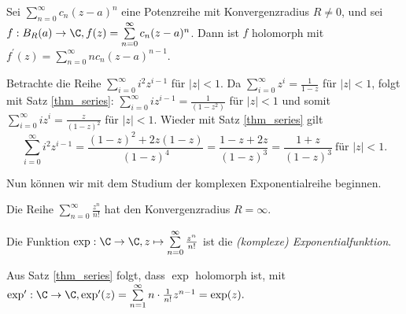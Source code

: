 \lecture
		\begin{thm}\label{thm_series}
			Sei $ \sum\limits_{n=0}^\infty c_n (z-a)^n $ eine Potenzreihe mit Konvergenzradius $R \neq 0$, und sei $ f: B_R(a) \to \C, f(z) = \sum\limits_{n=0}^\infty c_n (z-a)^n $. Dann ist $f$ holomorph mit $ f^\prime(z) = \sum\limits_{n=0}^\infty n c_n (z-a)^{n-1} $.
		\end{thm}
		
		\begin{exmp}
			Betrachte die Reihe $ \sum\limits_{i=0}^\infty i^2 z^{i-1} $ für $|z| < 1$. Da $ \sum\limits_{i=0}^\infty z^{i} = \frac{1}{1-z} $ für $|z|<1$, folgt mit Satz \ref{thm_series}: $ \sum\limits_{i=0}^\infty i z^{i-1} = \frac{1}{(1-z^2)} $ für $|z|<1$ und somit $ \sum\limits_{i=0}^\infty i z^{i} = \frac{z}{(1-z)^2} $ für $|z|<1$. Wieder mit Satz \ref{thm_series} gilt
			\[ \sum\limits_{i=0}^\infty i^2 z^{i-1} = \frac{(1-z)^2+2z(1-z)}{(1-z)^4} = \frac{1-z+2z}{(1-z)^3} = \frac{1+z}{(1-z)^3}\ \text{für } |z|<1. \]
		\end{exmp}
		
		Nun können wir mit dem Studium der komplexen Exponentialreihe beginnen.
		
		\begin{lem}
			Die Reihe $ \sum\limits_{n=0}^\infty \frac{z^n}{n!} $ hat den Konvergenzradius $ R = \infty $.
		\end{lem}
		
		\begin{defn}
			Die Funktion $ \exp: \C \to \C, z \mapsto \sum\limits_{n=0}^\infty \frac{z^n}{n!} $ ist die \emph{(komplexe) Exponentialfunktion}.
		\end{defn}
		
		Aus Satz \ref{thm_series} folgt, dass $\exp$ holomorph ist, mit $ \exp^\prime:\C \to \C, \exp^\prime(z) = \sum\limits_{n=1}^\infty n \cdot \frac{1}{n!} z^{n-1} = \exp(z). $\\
		
